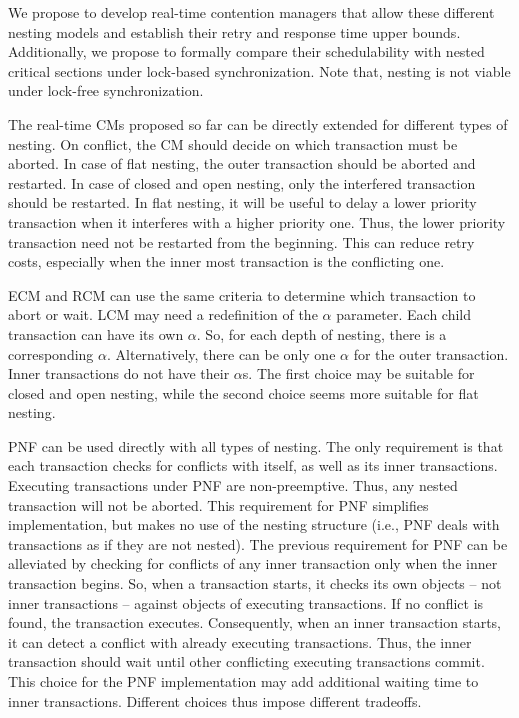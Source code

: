\documentclass[12pt,english]{report}
\begin{document}
We propose to develop real-time contention managers that allow these different nesting models and establish their retry and response time upper bounds. Additionally, we propose to formally compare their schedulability with nested critical sections under lock-based synchronization. Note that, nesting is not viable under lock-free synchronization.


The real-time CMs proposed so far can be directly extended for different types of nesting. On conflict, the CM should decide on which transaction must be  aborted. In case of flat nesting, the outer transaction should be aborted and restarted. In case of closed and open nesting, only the interfered transaction should be restarted. In flat nesting, it will be useful to delay a lower priority transaction when it interferes with a higher priority one. Thus, the lower priority transaction need not be restarted from the beginning. This can reduce retry costs, especially when the inner most transaction is the conflicting one.


ECM and RCM can use the same criteria to determine which transaction to abort or wait. LCM may need a redefinition of the $\alpha$ parameter. Each child transaction can have its own $\alpha$. So, for each depth of nesting, there is a corresponding $\alpha$. Alternatively, there can be only one $\alpha$ for the outer transaction. Inner transactions do not have their $\alpha$s. The first choice may be suitable for closed and open nesting, while the second choice seems more suitable for flat nesting. 


PNF can be used directly with all types of nesting. The only requirement is that each transaction checks for conflicts with itself, as well as its inner transactions. Executing transactions under PNF are non-preemptive. Thus, any nested transaction will not be aborted. This requirement for PNF simplifies implementation, but makes no use of the nesting structure (i.e., PNF deals with transactions as if they are not nested). The previous requirement for PNF can be alleviated by checking for conflicts of any inner transaction only when the inner transaction begins. So, when a transaction starts, it checks its own objects -- not inner transactions -- against objects of executing transactions. If no conflict is found, the transaction executes. Consequently, when an inner transaction starts, it can detect a conflict with already executing transactions. Thus, the inner transaction should wait until other conflicting executing transactions commit. This choice for the PNF implementation may add additional waiting time to inner transactions. Different choices thus impose different tradeoffs. 
\end{document}
